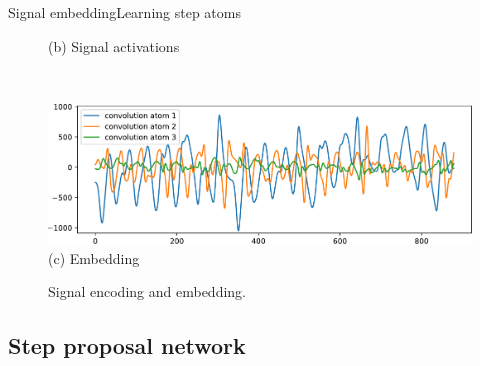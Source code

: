 \documentclass[9pt,t,aspectratio=1610]{beamer}
\newcommand{\ratio}{0.5}
\begin{document}
\begin{frame}{Signal embedding}{Learning step atoms}
\begin{minipage}[t]{0.54\linewidth}
\begin{figure}
\begin{minipage}{\linewidth}
            {\small (b)\; Signal activations}
        \end{minipage}\\
        \begin{minipage}{\linewidth}
            \centering
            \includegraphics[trim= 0 0 0 0, width=\ratio\linewidth, clip]{signal_walk_young_female_csc_3.pdf}\\
            {\small (c)\; Embedding}
        \end{minipage}
        \caption{Signal encoding and embedding.}
    \end{figure}
\end{minipage}

\end{frame}



\subsection{Step proposal network}

\begin{frame}[noframenumbering]{\ }
\hfill
\parbox[t]{.85\textwidth}{
  \begin{minipage}[c][0.65\textheight]{\textwidth}
  \tableofcontents[currentsection, subsectionstyle=show/shaded/shaded]
  \end{minipage}
}
\end{frame}
\end{document}
